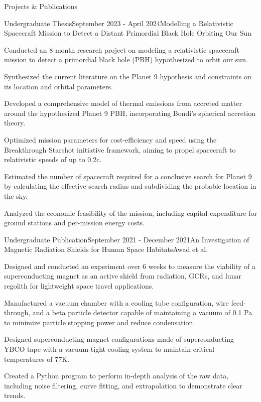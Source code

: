 \documentclass{resume} %
\begin{document}
\begin{rSection}{Projects \& Publications}

\begin{rSubsection}{Undergraduate Thesis}{September 2023 - April 2024}{Modelling a Relativistic Spacecraft Mission to Detect a Distant Primordial Black Hole Orbiting Our Sun}{}
\item Conducted an 8-month research project on modeling a relativistic spacecraft mission to detect a primordial black hole (PBH) hypothesized to orbit our sun.
\item Synthesized the current literature on the Planet 9 hypothesis and constraints on its location and orbital parameters.
\item Developed a comprehensive model of thermal emissions from accreted matter around the hypothesized Planet 9 PBH, incorporating Bondi's spherical accretion theory.
\item Optimized mission parameters for cost-efficiency and speed using the Breakthrough Starshot initiative framework, aiming to propel spacecraft to relativistic speeds of up to 0.2c.
\item Estimated the number of spacecraft required for a conclusive search for Planet 9 by calculating the effective search radius and subdividing the probable location in the sky.
\item Analyzed the economic feasibility of the mission, including capital expenditure for ground stations and per-mission energy costs.

\end{rSubsection}


\begin{rSubsection}{Undergraduate Publication}{September 2021 - December 2021}{An Investigation of Magnetic Radiation Shields for Human Space Habitats}{Awad et al.}
\item Designed and conducted an experiment over 6 weeks to measure the viability of a superconducting magnet as an active shield from radiation, GCRs, and lunar regolith for lightweight space travel applications.
\item Manufactured a vacuum chamber with a cooling tube configuration, wire feed-through, and a beta particle detector capable of maintaining a vacuum of 0.1 Pa to minimize particle stopping power and reduce condensation.
\item Designed superconducting magnet configurations made of superconducting YBCO tape with a vacuum-tight cooling system to maintain critical temperatures of 77K.
\item Created a Python program to perform in-depth analysis of the raw data, including noise filtering, curve fitting, and extrapolation to demonstrate clear trends.


\end{rSubsection}
\end{rSection}
\end{document}
